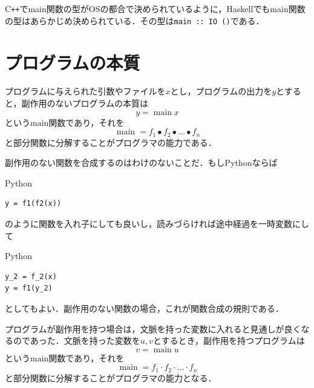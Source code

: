 \documentclass[a4paper]{jsbook}
\newcommand{\programminglanguage}[1]{\textsf{#1}}
\newcommand{\cxx}{\programminglanguage{C}\texttt{++}}
\newcommand{\haskell}{\programminglanguage{Haskell}}
\newcommand{\python}{\programminglanguage{Python}}
\newcommand{\code}[1]{\texttt{#1}}
\newenvironment{pythoncode}{\begin{itembox}[r]{\python}}{\end{itembox}}
\DeclareMathOperator{\mathMain}{main}
\newcommand{\mathCompose}{\mathbin{\bullet}}
\newcommand{\mathGeneralMap}{\mathbin{\cdot}}
\begin{document}
\cxx でmain関数の型がOSの都合で決められているように，\haskell でもmain関数の型はあらかじめ決められている．その型は\code{main :: IO ()}である．


\section{プログラムの本質}

プログラムに与えられた引数やファイルを$x$とし，プログラムの出力を$y$とすると，副作用のないプログラムの本質は
\begin{equation}
y=\mathMain x
\end{equation}
という$\text{main}$関数であり，それを
\begin{equation}
\mathMain=f_1\mathCompose f_2\mathCompose\dots\mathCompose f_n
\end{equation}
と部分関数に分解することがプログラマの能力である．

副作用のない関数を合成するのはわけのないことだ．もし\python ならば
\begin{pythoncode}
\begin{verbatim}
y = f1(f2(x))
\end{verbatim}
\end{pythoncode}
のように関数を入れ子にしても良いし，読みづらければ途中経過を一時変数にして
\begin{pythoncode}
\begin{verbatim}
y_2 = f_2(x)
y = f1(y_2)
\end{verbatim}
\end{pythoncode}
としてもよい．副作用のない関数の場合，これが関数合成の規則である．

プログラムが副作用を持つ場合は，文脈を持った変数に入れると見通しが良くなるのであった．文脈を持った変数を$u,v$とするとき，副作用を持つプログラムは
\begin{equation}
v=\mathMain u
\end{equation}
という$\text{main}$関数であり，それを
\begin{equation}
\mathMain=f_1\mathGeneralMap f_2\mathGeneralMap\dots\mathGeneralMap f_n
\end{equation}
と部分関数に分解することがプログラマの能力となる．
\end{document}
